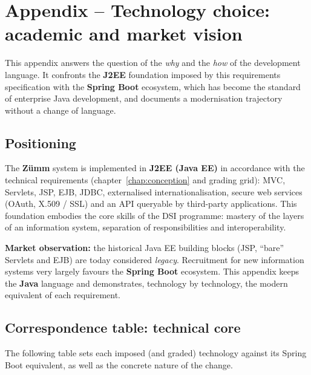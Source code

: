 
\chapter{Appendix -- Technology choice: academic and market vision}
\label{chap:migration}
This appendix answers the question of the \emph{why} and the \emph{how} of the
development language. It confronts the \textbf{J2EE} foundation imposed by this
requirements specification with the \textbf{Spring Boot} ecosystem, which has
become the standard of enterprise Java development, and documents a
modernisation trajectory without a change of language.

\section{Positioning}
The \textbf{Zümm} system is implemented in \textbf{J2EE (Java EE)} in accordance
with the technical requirements (chapter~\ref{chap:conception} and grading grid):
MVC, Servlets, JSP, EJB, JDBC, externalised internationalisation, secure web
services (OAuth, X.509 / SSL) and an API queryable by third-party applications.
This foundation embodies the core skills of the DSI programme: mastery of the
layers of an information system, separation of responsibilities and
interoperability.

\begin{encadre}
\textbf{Market observation:} the historical Java EE building blocks (JSP,
``bare'' Servlets and EJB) are today considered \emph{legacy}. Recruitment for
new information systems very largely favours the \textbf{Spring Boot} ecosystem.
This appendix keeps the \textbf{Java} language and demonstrates, technology by
technology, the modern equivalent of each requirement.
\end{encadre}

\section{Correspondence table: technical core}
The following table sets each imposed (and graded) technology against its Spring
Boot equivalent, as well as the concrete nature of the change.

